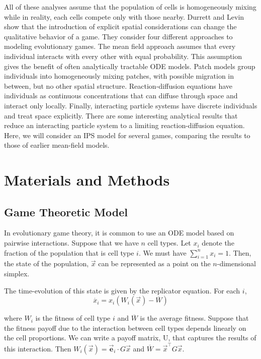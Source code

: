 \documentclass[12pt]{report}
\begin{document}
	
	All of these analyses assume that the population of cells is homogeneously mixing while in reality, each cells compete only with those nearby. Durrett and Levin \cite{Durrett1994} show that the introduction of explicit spatial considerations can change the qualitative behavior of a game. They consider four different approaches to modeling evolutionary games. The mean field approach assumes that every individual interacts with every other with equal probability. This assumption gives the benefit of often analytically tractable ODE models. Patch models group individuals into homogeneously mixing patches, with possible migration in between, but no other spatial structure. Reaction-diffusion equations have individuals as continuous concentrations that can diffuse through space and interact only locally. Finally, interacting particle systems have discrete  individuals and treat space explicitly. There are some interesting analytical results that reduce an interacting particle system to a limiting reaction-diffusion equation. Here, we will consider an IPS model for several games, comparing the results to those of earlier mean-field models. \\
	
	
	
	
	

	
\chapter*{Materials and Methods}
\section*{Game Theoretic Model}
	In evolutionary game theory, it is common to use an ODE model based on pairwise interactions. Suppose that we have $n$ cell types. Let $x_i$ denote the fraction of the population that is cell type $i$. We must have $\sum_{i=1}^n x_i = 1$. Then, the state of the population, $\vec{x}$ can be represented as a point on the $n$-dimensional simplex. 
	
	The time-evolution of this state is given by the replicator equation. For each $i$, 
	$$\dot{x_i} = x_i (W_i(\vec{x}) - \overline{W})$$
	
	where $W_i$ is the fitness of cell type $i$ and $\overline{W}$ is the average fitness. Suppose that the fitness payoff due to the interaction between cell types depends linearly on the cell proportions. We can write a payoff matrix, U, that captures the results of this interaction. Then $W_i(\vec{x}) = \vec{\textbf{e}}_i \cdot G\vec{x} $ and $\overline{W} = \vec{x}^\top G \vec{x}$.
	
\end{document}
